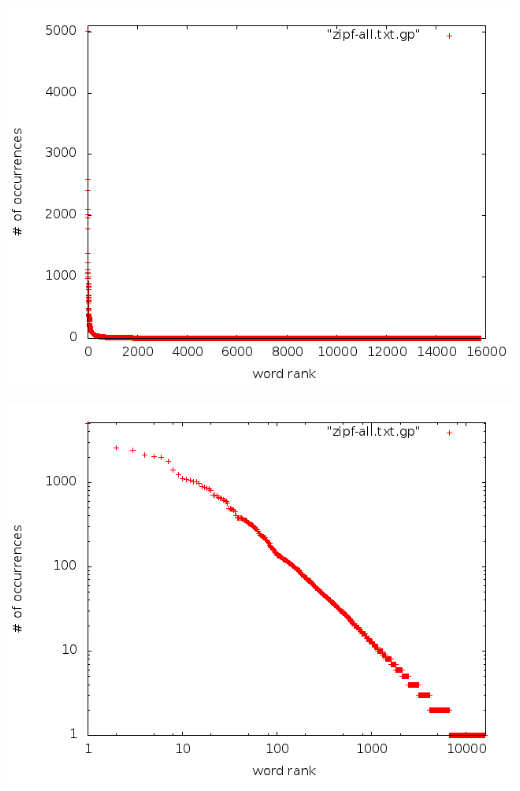 \begin{frame}[c]
	\includegraphics[scale=0.4]{../task02-04/src/main/resources/results/task3/zipf-lin.png}
\end{frame}

\begin{frame}[c]
	\includegraphics[scale=0.4]{../task02-04/src/main/resources/results/task3/zipf-log.png} 
\end{frame}	

